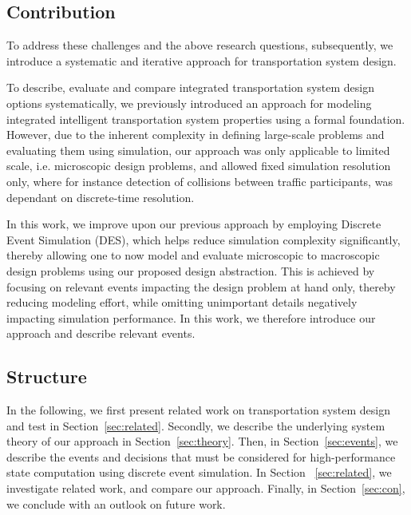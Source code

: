 \documentclass[graybox]{svmult}
\begin{document}
\subsection{Contribution}
To address these challenges and the above research questions, subsequently, we introduce a systematic and iterative approach for transportation system design.

To describe, evaluate and compare integrated transportation system design options systematically, we previously introduced an approach for modeling integrated intelligent transportation system properties using a formal foundation. However, due to the inherent complexity in defining large-scale problems and evaluating them using simulation, our approach was only applicable to limited scale, i.e. microscopic design problems, and allowed fixed simulation resolution only, where for instance detection of collisions between traffic participants, was dependant on discrete-time resolution.  

In this work, we improve upon our previous approach by employing Discrete Event Simulation (DES), which helps reduce simulation complexity significantly, thereby allowing one to now model and evaluate microscopic to macroscopic design problems using our proposed design abstraction. This is achieved by focusing on relevant events impacting the design problem at hand only, thereby reducing modeling effort, while omitting unimportant details negatively impacting simulation performance. In this work, we therefore introduce our approach and describe relevant events. 


\subsection{Structure}
In the following, we first present related work on transportation system design and test in Section~\ref{sec:related}.
Secondly, we describe the underlying system theory of our approach in Section~\ref{sec:theory}.
Then, in Section~\ref{sec:events}, we describe the events and decisions that must be considered for high-performance state computation using discrete event simulation. In Section ~\ref{sec:related}, we investigate related work, and compare our approach.
Finally, in Section~\ref{sec:con}, we conclude with an outlook on future work.
\end{document}
